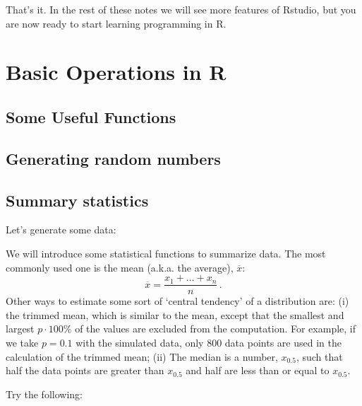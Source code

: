 That's it. In the rest of these notes we will see more features of Rstudio, but you are now ready to start learning programming in R.


\section{Basic Operations in R}
\subsection{Some Useful Functions}


\subsection{Generating random numbers}



\subsection{Summary statistics}
Let's generate some data:


We will introduce some statistical functions to summarize data. The most commonly used one is the mean (a.k.a. the average), $\overline{x}$:\\
$$\overline{x}=\frac{x_1+\ldots+x_n}{n}\,.$$
Other ways to estimate some sort of `central tendency' of a distribution are:
 (i) the trimmed mean, which is similar to the mean, except that the smallest and largest $p\cdot 100\%$  of the values are excluded from the computation. For example, if we take $p=0.1$ with the simulated data, only 800 data points are used in the calculation of the trimmed mean; (ii) The median is a number, $x_{0.5}$, such that half the data points are greater than $x_{0.5}$ and half are less than or equal to $x_{0.5}$. 

Try the following:



